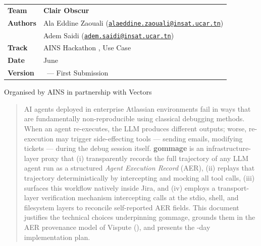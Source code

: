 \documentclass[11pt, a4paper]{article}
\begin{document}
\begin{titlepage}
  \begin{table}[h]
    \centering\dialogfont\color{purewhite}
    \begin{tabular}{L{3cm} L{10cm}}
      \textbf{\titlefont Team}    & \textbf{Clair Obscur} \\
      \addlinespace[0.2em]
      \textbf{\titlefont Authors} & Ala Eddine Zaouali (\href{mailto:alaeddine.zaouali@insat.ucar.tn}{\texttt{alaeddine.zaouali@insat.ucar.tn}}) \\
                       & Adem Saidi (\href{mailto:adem.saidi@insat.ucar.tn}{\texttt{adem.saidi@insat.ucar.tn}}) \\
      \addlinespace[0.2em]
      \textbf{\titlefont Track}   & AINS Hackathon \dialogfont, Use Case  \\
      \textbf{\titlefont Date}    & June  \\
      \textbf{\titlefont Version} & \dialogfont~— First Submission \\
    \end{tabular}
  \end{table}

  \vfill
  {\titlefont\footnotesize\textcolor{golddark}{Organised by AINS  \titlefont in partnership with Vectors}}
\end{titlepage}

\begin{abstract}
\noindent
AI agents deployed in enterprise Atlassian environments fail in ways that are fundamentally non-reproducible using classical debugging methods. When an agent re-executes, the LLM produces different outputs; worse, re-execution may trigger side-effecting tools — sending emails, modifying tickets — during the debug session itself. \textbf{gommage} is an infrastructure-layer proxy that (i) transparently records the full trajectory of any LLM agent run as a structured \textit{Agent Execution Record} (AER), (ii) replays that trajectory deterministically by intercepting and mocking all tool calls, (iii) surfaces this workflow natively inside Jira, and (iv) employs a transport-layer verification mechanism intercepting calls at the stdio, shell, and filesystem layers to reconcile self-reported AER fields. This document justifies the technical choices underpinning gommage, grounds them in the AER provenance model of Vispute (\rmfamily), and presents the \rmfamily-day implementation plan.
\end{abstract}
\end{document}
